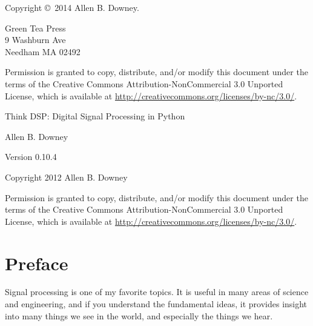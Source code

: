 \documentclass[12pt]{book}
\newcommand{\thetitle}{Think DSP: Digital Signal Processing in Python}
\newcommand{\theversion}{0.10.4}
\begin{document}
\begin{latexonly}
Copyright \copyright ~2014 Allen B. Downey.


\vspace{0.2in}

\begin{flushleft}
Green Tea Press       \\
9 Washburn Ave \\
Needham MA 02492
\end{flushleft}

Permission is granted to copy, distribute, and/or modify this document
under the terms of the Creative Commons Attribution-NonCommercial 3.0 Unported
License, which is available at \url{http://creativecommons.org/licenses/by-nc/3.0/}.

\vspace{0.2in}

\end{latexonly}



\begin{htmlonly}


{\Large \thetitle}

{\large Allen B. Downey}

Version \theversion

\vspace{0.25in}

Copyright 2012 Allen B. Downey

\vspace{0.25in}

Permission is granted to copy, distribute, and/or modify this document
under the terms of the Creative Commons Attribution-NonCommercial 3.0
Unported License, which is available at
\url{http://creativecommons.org/licenses/by-nc/3.0/}.

\setcounter{chapter}{-1}

\end{htmlonly}

\fi

\chapter{Preface}
\label{preface}

Signal processing is one of my favorite topics.  It is useful
in many areas of science and engineering, and if you understand
the fundamental ideas, it provides insight into many things
we see in the world, and especially the things we hear.
\end{document}

